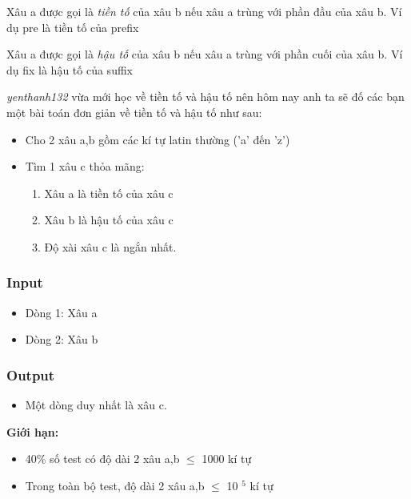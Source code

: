 



   Xâu a được gọi là   \emph{    tiền tố   }   của xâu b nếu xâu a trùng với phần đầu của xâu b. Ví dụ       pre      là tiền tố của       prefix   

   Xâu a được gọi là   \emph{    hậu tố   }   của xâu b nếu xâu a trùng với phần cuối của xâu b. Ví dụ       fix      là hậu tố của       suffix   

\emph{    yenthanh132   }   vừa mới học về tiền tố và hậu tố nên hôm nay anh ta sẽ đố các bạn một bài toán đơn giản về tiền tố và hậu tố như sau:  
\begin{itemize}
	\item     Cho 2 xâu a,b gồm các kí tự latin thường ('a' đến 'z')   
	\item     Tìm 1 xâu c thỏa mãng:    
\begin{enumerate}
	\item       Xâu a là tiền tố của xâu c     
	\item       Xâu b là hậu tố của xâu c     
	\item       Độ xài xâu c là ngắn nhất.     
\end{enumerate}
\end{itemize}
\begin{enumerate}
\end{enumerate}

\subsubsection{   Input  }
\begin{itemize}
	\item     Dòng 1: Xâu a   
	\item     Dòng 2: Xâu b   
\end{itemize}

\subsubsection{   Output  }
\begin{itemize}
	\item     Một dòng duy nhất là xâu c.   
\end{itemize}

\textbf{     Giới hạn:    }
\begin{itemize}
	\item     40\% số test có độ dài 2 xâu a,b  $\le$  1000 kí tự   
	\item     Trong toàn bộ test, độ dài 2 xâu a,b  $\le$  10    $^     5    $    kí tự   
\end{itemize}

